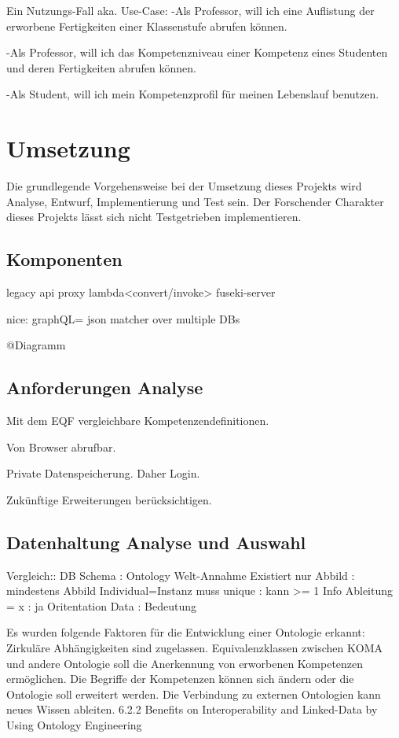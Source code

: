 \documentclass[
12pt,
english,
ngerman,
headsepline,
twoside,
openright,
numbers=noenddot,version=first
]{scrreprt}
\begin{document}
Ein Nutzungs-Fall aka. Use-Case: 
-Als Professor, will ich eine Auflistung der erworbene Fertigkeiten einer Klassenstufe abrufen können.

-Als Professor, will ich das Kompetenzniveau einer Kompetenz eines Studenten und deren Fertigkeiten abrufen können.

-Als Student, will ich mein Kompetenzprofil für meinen Lebenslauf benutzen.

\chapter{Umsetzung}
Die grundlegende Vorgehensweise bei der Umsetzung dieses Projekts wird Analyse, Entwurf, Implementierung und Test sein. Der Forschender Charakter dieses Projekts lässt sich nicht Testgetrieben implementieren. 

\section{Komponenten}
legacy api proxy\cite{sbarski2017serverless}
lambda<convert/invoke> fuseki-server\label{komponenten:fuseki}

nice: graphQL= json matcher over multiple DBs

@Diagramm

\section{Anforderungen Analyse}
Mit dem EQF vergleichbare Kompetenzendefinitionen.

Von Browser abrufbar. 

Private Datenspeicherung. Daher Login.

Zukünftige Erweiterungen berücksichtigen.

\section{Datenhaltung Analyse und Auswahl}


Vergleich:: DB Schema                       : Ontology
Welt-Annahme Existiert nur Abbild           : mindestens Abbild
Individual=Instanz muss unique              : kann >= 1
Info Ableitung = x                          : ja
Oritentation    Data                        : Bedeutung

Es wurden folgende Faktoren für die Entwicklung einer Ontologie erkannt:
Zirkuläre Abhängigkeiten sind zugelassen.  
Equivalenzklassen zwischen KOMA und andere Ontologie soll die Anerkennung von erworbenen Kompetenzen ermöglichen.
Die Begriffe der Kompetenzen können sich ändern oder die Ontologie soll erweitert werden.
Die Verbindung zu externen Ontologien kann neues Wissen ableiten.
6.2.2 \cite{OntoCloud}Benefits on Interoperability and Linked-Data by Using
Ontology Engineering
\end{document}

